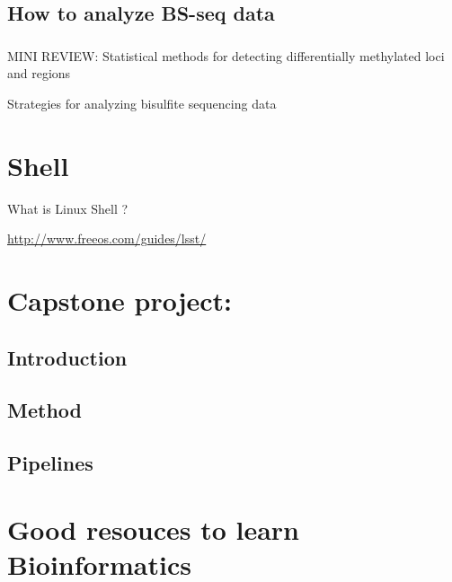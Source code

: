 \documentclass[]{book}
\theoremstyle{definition}
\theoremstyle{definition}
\theoremstyle{definition}
\theoremstyle{remark}
\begin{document}
\section{}\label{section-9}

\section{How to analyze BS-seq data}\label{how-to-analyze-bs-seq-data}

\subsection{}\label{section-10}

MINI REVIEW: Statistical methods for detecting differentially methylated
loci and regions

Strategies for analyzing bisulfite sequencing data

\chapter{Shell}\label{shell}

What is Linux Shell ?

\url{http://www.freeos.com/guides/lsst/}

\chapter{Capstone project:}\label{capstone-project}

\section{Introduction}\label{introduction}

\section{Method}\label{method}

\section{Pipelines}\label{pipelines}

\section{}\label{section-11}

\chapter{Good resouces to learn
Bioinformatics}\label{good-resouces-to-learn-bioinformatics}
\end{document}
